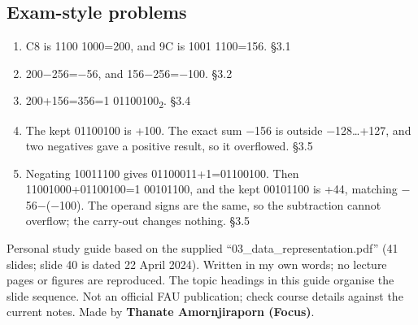 \documentclass[11pt]{article}
\begin{document}
\begin{keepsection}\subsection{Exam-style problems}

\begin{enumerate}
\item C8 is 1100 1000=200, and 9C is 1001 1100=156. \hfill{\small\color{FAUblue}§3.1}
\item 200\ensuremath{-}256=\ensuremath{-}56, and 156\ensuremath{-}256=\ensuremath{-}100. \hfill{\small\color{FAUblue}§3.2}
\item 200+156=356=1 01100100\textsubscript{2}. \hfill{\small\color{FAUblue}§3.4}
\item The kept 01100100 is +100. The exact sum \ensuremath{-}156 is outside \ensuremath{-}128…+127, and two negatives gave a positive result, so it overflowed. \hfill{\small\color{FAUblue}§3.5}
\item Negating 10011100 gives 01100011+1=01100100. Then 11001000+01100100=1 00101100, and the kept 00101100 is +44, matching \ensuremath{-}56\ensuremath{-}(\ensuremath{-}100). The operand signs are the same, so the subtraction cannot overflow; the carry-out changes nothing. \hfill{\small\color{FAUblue}§3.5}
\end{enumerate}

\end{keepsection}

\vfill{\small Personal study guide based on the supplied “03\_data\_representation.pdf” (41 slides; slide 40 is dated 22 April 2024). Written in my own words; no lecture pages or figures are reproduced. The topic headings in this guide organise the slide sequence. Not an official FAU publication; check course details against the current notes. Made by \textbf{Thanate Amornjiraporn (Focus)}.}
\end{document}

